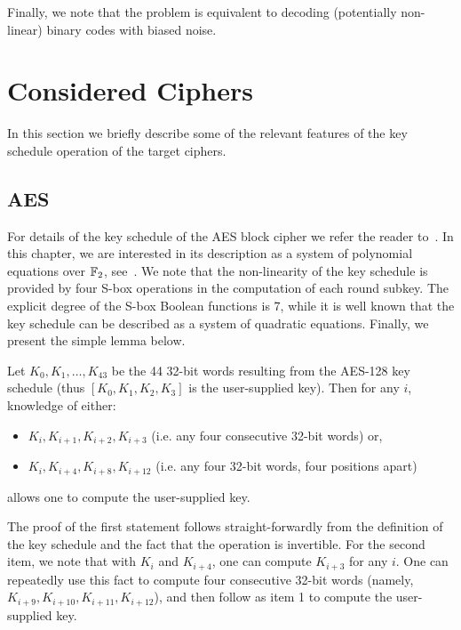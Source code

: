 Finally, we note that the \coldboot problem is equivalent to decoding (potentially non-linear) binary codes with biased noise.

\section{Considered Ciphers}

In this section we briefly describe some of the relevant features of the key schedule operation of the target ciphers.

\subsection{AES}
For details of the key schedule of the AES block cipher we refer the reader to~\cite{Daemen2002}. 
In this chapter, we are interested in its description as a system of polynomial equations over $\mathbb{F}_2$, see~\cite{alg-aes-book}.
We note that the non-linearity of the key schedule is provided by four S-box operations in the computation of each round subkey.
The explicit degree of the S-box Boolean functions is 7, while it is well known that the key schedule can be described as a system of quadratic equations. Finally, we present the simple lemma below.

\begin{lemma}
\label{lemma:aes}
Let $K_0, K_1, \ldots, K_{43}$ be the 44 32-bit words resulting from the AES-128 key schedule (thus $[K_0,K_1, K_2,K_3]$ is the user-supplied key). Then for any $i$, knowledge of either:
\begin{itemize}
\item $K_i, K_{i+1}, K_{i+2}, K_{i+3}$ (i.e. any four consecutive 32-bit words) or, 
\item $K_i, K_{i+4}, K_{i+8}, K_{i+12}$ (i.e. any four 32-bit words, four positions apart)
\end{itemize}
allows one to compute the user-supplied key. 
\end{lemma}
The proof of the first statement follows straight-forwardly from the definition of the key schedule and the fact that the operation is invertible. For the second item, we note that with $K_{i}$ and $K_{i+4}$,
one can compute $K_{i+3}$ for any $i$. One can repeatedly use this fact to compute four consecutive 32-bit words (namely, $K_{i+9}, K_{i+10}, K_{i+11}, K_{i+12}$), and then follow as item 1 to compute 
the user-supplied key. 

